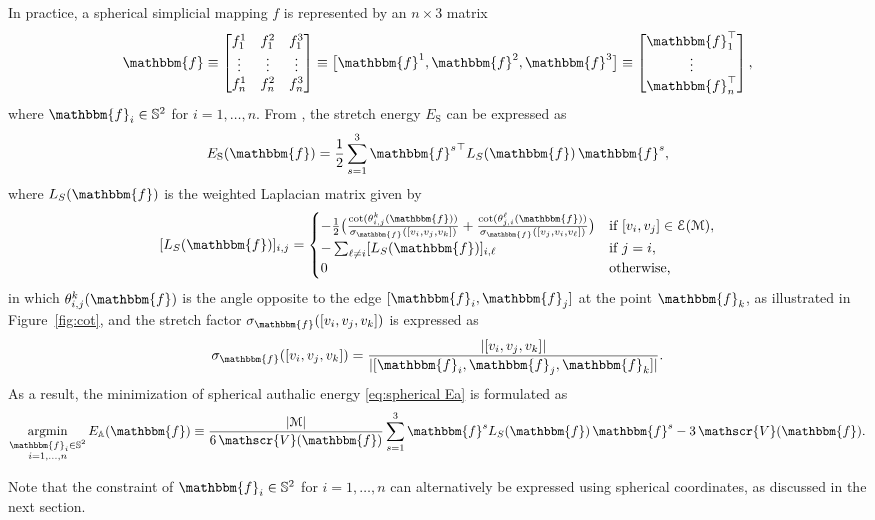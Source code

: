 \documentclass{article}
\numberwithin{equation}{section}
\def\bf{\mathbbm{f}}
\def\rS{\mathrm{S}}
\def\bbA{\mathbb{A}}
\def\M{\mathcal{M}}
\def\bV{\mathscr{V}}
\newcommand{\argmin}{\operatornamewithlimits{argmin}}
\begin{document}
In practice, a spherical simplicial mapping $f$ is represented by an $n\times 3$ matrix
\begin{equation*}
\bf \equiv 
\begin{bmatrix}
    f^1_1   &   f^2_1  &  f^3_1\\
    \vdots     &   \vdots    &  \vdots\\
    f^1_n   &   f^2_n  &  f^3_n
\end{bmatrix} \equiv \big[ \bf^1, \bf^2, \bf^3 \big] \equiv
\begin{bmatrix}
    \bf_1^\top \\
    \vdots\\
    \bf_n^\top
\end{bmatrix},
\label{eq:f matrix}
\end{equation*}
where $\bf_i \in \mathbb S^2$ for $i = 1, \ldots, n$. 
From \cite[Lemma 3.1]{Yueh23}, the stretch energy $E_\rS$ can be expressed as
\[
E_\rS(\bf) = \frac{1}{2} \sum_{s = 1}^3  {\bf^s}^\top L_S(\bf) \,\bf^s,
\]
where $L_S(\bf)$ is the weighted Laplacian matrix given by
\begin{equation*} \label{eq:Ls}
[L_S(\bf)]_{i, j}=
\begin{cases}
    -\frac{1}{2} \big(\frac{\cot(\theta_{i, j}^k(\bf))}{\sigma_{\bf}([v_i, v_j, v_k])} + \frac{\cot (\theta_{j, i}^\ell (\bf))}{\sigma_{\bf}([v_j, v_i, v_\ell])} \big)   &\text{if}~ [v_i, v_j] \in \mathcal{E(M)},\\
    -\sum_{\ell \neq i} [L_S(\bf)]_{i, \ell}     &\text{if}~j=i,\\
    0       &\text{otherwise,}
\end{cases}
\end{equation*}
in which $\theta_{i,j}^k (\bf)$ is the angle opposite to the edge $[\bf_i, \bf_j]$ at the point $\bf_k$, as illustrated in Figure~\ref{fig:cot}, and the stretch factor $\sigma_{\bf}([v_i, v_j, v_k])$ is expressed as
$$
\sigma_{\bf}([v_i, v_j, v_k]) = \frac{|[v_i, v_j, v_k]|}{|[\bf_i, \bf_j, \bf_k]|}.
$$
As a result, the minimization of spherical authalic energy \eqref{eq:spherical Ea} is formulated as 
\begin{equation}
\argmin_{ \substack{\bf_i\in \mathbb{S}^2\\ i = 1,\ldots, n} } E_\bbA(\bf) \equiv\frac{|\M|}{6\, \bV(\bf)} \sum_{s = 1}^3 \bf^s L_S(\bf) \, \bf^s - 3 \, \bV(\bf).
\label{eq:obj_fun}
\end{equation}

Note that the constraint of $\bf_i\in \mathbb{S}^2$ for $i = 1,\ldots, n$ can alternatively be expressed using spherical coordinates, as discussed in the next section.
\end{document}
